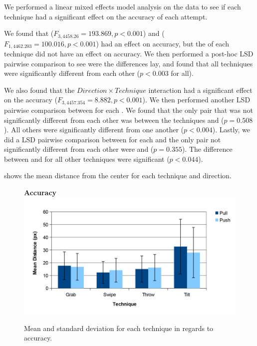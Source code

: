 We performed a linear mixed effects model analysis on the data to see if each technique had a significant effect on the accuracy of each attempt. 

We found that \technique ($F_{3,4458.26}=193.869, p<0.001$) and \targetsize ($F_{1,4462.203}=100.016, p<0.001$) had an effect on accuracy, but the \direction of each technique did not have an effect on accuracy. 
We then performed a post-hoc LSD pairwise comparison to see were the differences lay, and found that all techniques were significantly different from each other ($p<0.003$ for all).

We also found that the $Direction \times Technique$ interaction had a significant effect on the accuracy ($F_{3,4457.354}=8.882, p<0.001$).
We then performed another LSD pairwise comparison between \technique for each \direction. 
We found that the only pair that was not significantly different from each other was between the techniques \grab \push and \throw \push ($p=0.508$). 
All others were significantly different from one another ($p<0.004$). 
Lastly, we did a LSD pairwise comparison between \direction for each \technique and the only pair not significantly different from each other were \grab \push and \grab \pull ($p=0.355$).
The difference between \pull and \push for all other techniques were significant ($p<0.044$).

 shows the mean distance from the center for each technique and direction.
\begin{figure}[H]{
	\centering
	\textbf{Accuracy}\\[4pt]
	\includegraphics[width = 1\columnwidth ]{images/distance_graph.pdf}} 
	\caption{
		Mean and standard deviation for each technique in regards to accuracy.
	}
	\label{fig:accuracyGraph}
\end{figure}




